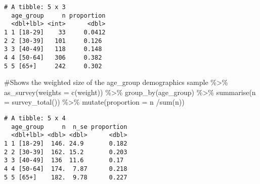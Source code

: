\documentclass[
  letterpaper,
  DIV=11,
  numbers=noendperiod]{scrreprt}
\newenvironment{Shaded}{\begin{snugshade}}{\end{snugshade}}
\newcommand{\AttributeTok}[1]{\textcolor[rgb]{0.40,0.45,0.13}{#1}}
\newcommand{\CommentTok}[1]{\textcolor[rgb]{0.37,0.37,0.37}{#1}}
\newcommand{\FunctionTok}[1]{\textcolor[rgb]{0.28,0.35,0.67}{#1}}
\newcommand{\NormalTok}[1]{\textcolor[rgb]{0.00,0.23,0.31}{#1}}
\newcommand{\SpecialCharTok}[1]{\textcolor[rgb]{0.37,0.37,0.37}{#1}}
\begin{document}
\begin{verbatim}
# A tibble: 5 x 3
  age_group     n proportion
  <dbl+lbl> <int>      <dbl>
1 1 [18-29]    33     0.0412
2 2 [30-39]   101     0.126 
3 3 [40-49]   118     0.148 
4 4 [50-64]   306     0.382 
5 5 [65+]     242     0.302 
\end{verbatim}

\begin{Shaded}
\begin{Highlighting}[]
\CommentTok{\#Shows the weighted size of the age\_group demographics}
\NormalTok{sample }\SpecialCharTok{\%\textgreater{}\%}
  \FunctionTok{as\_survey}\NormalTok{(}\AttributeTok{weights =} \FunctionTok{c}\NormalTok{(weight)) }\SpecialCharTok{\%\textgreater{}\%}
  \FunctionTok{group\_by}\NormalTok{(age\_group) }\SpecialCharTok{\%\textgreater{}\%}
  \FunctionTok{summarise}\NormalTok{(}\AttributeTok{n =} \FunctionTok{survey\_total}\NormalTok{()) }\SpecialCharTok{\%\textgreater{}\%} 
  \FunctionTok{mutate}\NormalTok{(}\AttributeTok{proportion =}\NormalTok{ n }\SpecialCharTok{/}\FunctionTok{sum}\NormalTok{(n))}
\end{Highlighting}
\end{Shaded}

\begin{verbatim}
# A tibble: 5 x 4
  age_group     n  n_se proportion
  <dbl+lbl> <dbl> <dbl>      <dbl>
1 1 [18-29]  146. 24.9       0.182
2 2 [30-39]  162. 15.2       0.203
3 3 [40-49]  136  11.6       0.17 
4 4 [50-64]  174.  7.87      0.218
5 5 [65+]    182.  9.78      0.227
\end{verbatim}
\end{document}
